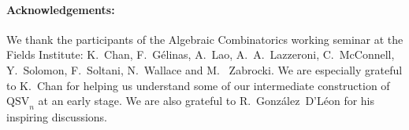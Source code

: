 \documentclass[submission]{FPSAC2024}
\theoremstyle{definition}
\theoremstyle{remark}
\numberwithin{equation}{section}
\newcommand{\QSV}{\mathrm{QSV}}
\begin{document}
\paragraph{Acknowledgements:}
We thank the participants of the Algebraic Combinatorics working seminar at the Fields Institute: K.~Chan, F.~G\'elinas, A.~Lao, A.~A.~Lazzeroni, C.~McConnell, Y.~Solomon, F.~Soltani,  N.~Wallace and 
M.~ Zabrocki. We are especially grateful to K.~Chan for helping us understand some of our intermediate construction of $\QSV_n$ at an early stage.
We are also grateful to R.~Gonz\'alez~D'L\'eon for his  inspiring discussions.%

\renewcommand*{\bibfont}{\normalfont\small}
\printbibliography
\end{document}
